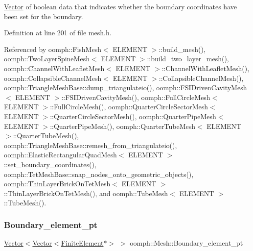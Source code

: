 \hyperlink{classoomph_1_1Vector}{Vector} of boolean data that indicates whether the boundary coordinates have been set for the boundary. 



Definition at line 201 of file mesh.\+h.



Referenced by oomph\+::\+Fish\+Mesh$<$ E\+L\+E\+M\+E\+N\+T $>$\+::build\+\_\+mesh(), oomph\+::\+Two\+Layer\+Spine\+Mesh$<$ E\+L\+E\+M\+E\+N\+T $>$\+::build\+\_\+two\+\_\+layer\+\_\+mesh(), oomph\+::\+Channel\+With\+Leaflet\+Mesh$<$ E\+L\+E\+M\+E\+N\+T $>$\+::\+Channel\+With\+Leaflet\+Mesh(), oomph\+::\+Collapsible\+Channel\+Mesh$<$ E\+L\+E\+M\+E\+N\+T $>$\+::\+Collapsible\+Channel\+Mesh(), oomph\+::\+Triangle\+Mesh\+Base\+::dump\+\_\+triangulateio(), oomph\+::\+F\+S\+I\+Driven\+Cavity\+Mesh$<$ E\+L\+E\+M\+E\+N\+T $>$\+::\+F\+S\+I\+Driven\+Cavity\+Mesh(), oomph\+::\+Full\+Circle\+Mesh$<$ E\+L\+E\+M\+E\+N\+T $>$\+::\+Full\+Circle\+Mesh(), oomph\+::\+Quarter\+Circle\+Sector\+Mesh$<$ E\+L\+E\+M\+E\+N\+T $>$\+::\+Quarter\+Circle\+Sector\+Mesh(), oomph\+::\+Quarter\+Pipe\+Mesh$<$ E\+L\+E\+M\+E\+N\+T $>$\+::\+Quarter\+Pipe\+Mesh(), oomph\+::\+Quarter\+Tube\+Mesh$<$ E\+L\+E\+M\+E\+N\+T $>$\+::\+Quarter\+Tube\+Mesh(), oomph\+::\+Triangle\+Mesh\+Base\+::remesh\+\_\+from\+\_\+triangulateio(), oomph\+::\+Elastic\+Rectangular\+Quad\+Mesh$<$ E\+L\+E\+M\+E\+N\+T $>$\+::set\+\_\+boundary\+\_\+coordinates(), oomph\+::\+Tet\+Mesh\+Base\+::snap\+\_\+nodes\+\_\+onto\+\_\+geometric\+\_\+objects(), oomph\+::\+Thin\+Layer\+Brick\+On\+Tet\+Mesh$<$ E\+L\+E\+M\+E\+N\+T $>$\+::\+Thin\+Layer\+Brick\+On\+Tet\+Mesh(), and oomph\+::\+Tube\+Mesh$<$ E\+L\+E\+M\+E\+N\+T $>$\+::\+Tube\+Mesh().

\mbox{\label{classoomph_1_1Mesh_a266ac14a3e884f978c8605f7b5786e81}} 
\subsubsection{\texorpdfstring{Boundary\+\_\+element\+\_\+pt}{Boundary\_element\_pt}}
{\footnotesize\ttfamily \hyperlink{classoomph_1_1Vector}{Vector}$<$\hyperlink{classoomph_1_1Vector}{Vector}$<$\hyperlink{classoomph_1_1FiniteElement}{Finite\+Element}$\ast$$>$ $>$ oomph\+::\+Mesh\+::\+Boundary\+\_\+element\+\_\+pt\hspace{0.3cm}{\ttfamily [protected]}}



